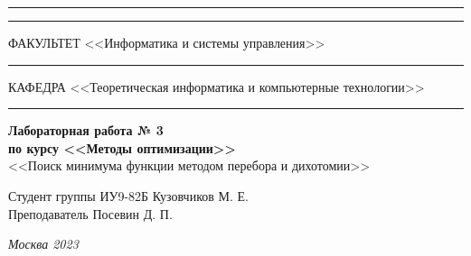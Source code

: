 \documentclass[a4paper, 14pt]{extarticle}
\begin{document}
\begin{titlepage}
\vspace{-25pt}
\hspace{-35pt}\rule{\textwidth}{2.3pt}

\vspace*{-20.3pt}
\hspace{-35pt}\rule{\textwidth}{0.4pt}

\vspace{1.5ex}
\hspace{-35pt} \noindent \small ФАКУЛЬТЕТ\hspace{80pt} <<Информатика и системы управления>>

\vspace*{-16pt}
\hspace{47pt}\rule{0.83\textwidth}{0.4pt}

\vspace{0.5ex}
\hspace{-35pt} \noindent \small КАФЕДРА\hspace{50pt} <<Теоретическая информатика и компьютерные технологии>>

\vspace*{-16pt}
\hspace{30pt}\rule{0.866\textwidth}{0.4pt}
  
\vspace{11em}

\begin{center}
\Large {\bf Лабораторная работа № 3} \\ 
\large {\bf по курсу <<Методы оптимизации>>} \\
\large <<Поиск минимума функции методом перебора и дихотомии>> 
\end{center}\normalsize

\vspace{8em}


\begin{flushright}
  {Студент группы ИУ9-82Б Кузовчиков М. Е. \hspace*{15pt}\\ 
  \vspace{2ex}
  Преподаватель Посевин Д. П.\hspace*{15pt}}
\end{flushright}

\bigskip

\vfill
 

\begin{center}
\textsl{Москва 2023}
\end{center}
\end{titlepage}
\end{document}
